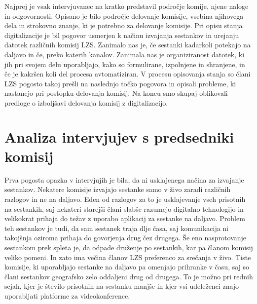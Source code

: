 \documentclass[a4paper,12pt,openright]{book}
\begin{document}
Najprej je vsak intervjuvanec na kratko predstavil področje komije, njene naloge in odgovornosti. 
Opisano je bilo področje delovanje komisije, vsebina njihovega dela in strokovno znanje, ki je potrebno za delovanje komisije. 
Pri opisu stanja digitalizacije je bil pogovor usmerjen k načinu izvajanja sestankov in urejanju datotek različnih komisij LZS. 
Zanimalo nas je, če sestanki kadarkoli potekajo na daljavo in če, preko katerih kanalov. 
Zanimala nas je organiziranost datotek, ki jih pri svojem delu uporabljajo, kako so formulirane, izpolnjene in shranjene, in če je kakršen koli del procesa avtomatiziran.
V procesu opisovanja stanja so člani LZS pogosto takoj prešli na naslednjo točko pogovora in opisali probleme, ki nastanejo pri postopku delovanja komisij. 
Na koncu smo skupaj oblikovali predloge o izboljšavi delovanja komisij z digitalizacijo. 

\section{Analiza intervjujev s predsedniki komisij}

Prva pogosta opazka v intervjujih je bila, da ni usklajenega načina za izvajanje sestankov. 
Nekatere komisije izvajajo sestanke samo v živo zaradi različnih razlogov in ne na daljavo. 
Eden od razlogov za to je usklajevanje vseh prisotnih na sestankih, saj nekateri starejši člani slabše razumejo digitalno tehnologijo in velikokrat prihaja do težav z uporabo aplikacij za sestanke na daljavo. 
Problem teh sestankov je tudi, da sam sestanek traja dlje časa, saj komunikacija ni takojšnja oziroma prihaja do govorjenja drug čez drugega. 
Še eno nasprotovanje sestankom prek spleta je, da odpade druženje po sestankih, kar pa članom komisij veliko pomeni. 
In zato ima večina članov LZS preferenco za srečanja v živo.
Tiste komisije, ki uporabljajo sestanke na daljavo pa omenjajo prihranke v času, saj so člani sestankov geografsko zelo oddaljeni drug od drugega. 
To je možno pri rednih sejah, kjer je število prisotnih na sestanku manjše in kjer vsi udeleženci znajo uporabljati platforme za videokonference.
\end{document}
